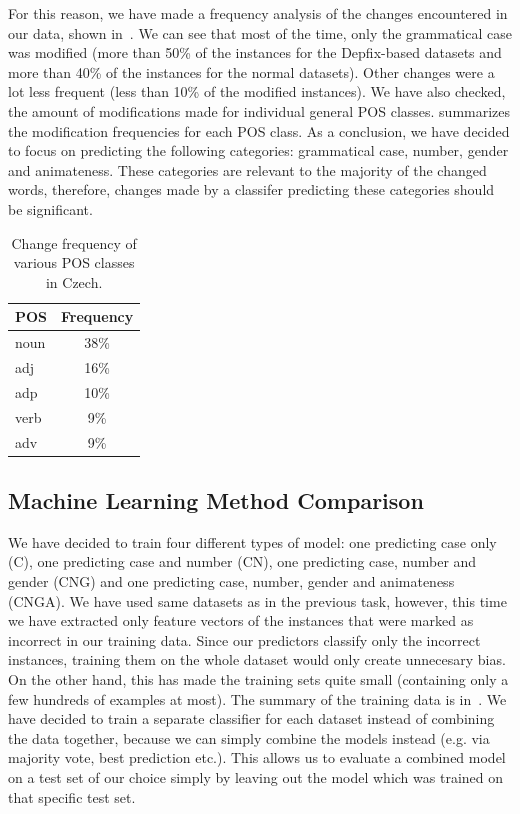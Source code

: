 For this reason, we have made a frequency analysis of the changes encountered
in our data, shown in~. We can see that most of the time, only the grammatical
case was modified (more than 50\% of the instances for the Depfix-based datasets and more than 40\% of the instances for
the normal datasets). Other changes were a lot less frequent (less than 10\% of the modified instances).
We have also checked, the amount of modifications made for individual general POS classes.
 summarizes the modification frequencies for each
POS class. As a conclusion, we have decided to focus on predicting the following categories: grammatical case, number, gender
and animateness. These categories are relevant to the majority of the changed words, therefore, changes made by
a classifer predicting these categories should be significant.

\begin{table}[t]
\centering
\small

\begin{tabular}{lc}
POS  &  Frequency  \\
\hline
noun    &   38\%  \\
adj     &   16\%  \\
adp     &   10\%  \\
verb    &   9\%  \\
adv     &   9\%  \\
\end{tabular}
\caption{
    Change frequency of various POS classes in Czech.
}
\label{changes-pos}
\end{table}


\subsection{Machine Learning Method Comparison}

We have decided to train four different types of model: one predicting case only (C), one predicting case and number (CN),
 one predicting case, number and gender (CNG) and one predicting case, number, gender and animateness (CNGA).
We have used same datasets as in the previous task, however, this
time we have extracted only feature vectors of the instances that were marked as incorrect in our training data. Since
our predictors classify only the incorrect instances, training them on the whole dataset would only create
unnecesary bias. On the other hand, this has made the training sets quite small (containing only a few hundreds of examples
at most). The summary of the training data is in~. We have decided to train a separate classifier
for each dataset instead of combining the data together, because we can simply combine the models instead (e.g. via majority
vote, best prediction etc.). This allows us to evaluate a combined model on a test set of our choice simply by leaving
out the model which was trained on that specific test set.

